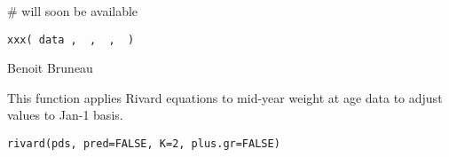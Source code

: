 \documentclass[a4paper]{book}
\begin{document}
%
\begin{Arguments}
\begin{ldescription}
\item[\code{x}] 


\item[\code{index}] 


\item[\code{threshold}] 


\end{ldescription}
\end{Arguments}
%
\begin{Examples}
\begin{ExampleCode}
# will soon be available
\end{ExampleCode}
\end{Examples}
\newpage
{}
%
\begin{Usage}
\begin{verbatim}
xxx( data ,  ,  ,  )
\end{verbatim}
\end{Usage}
%
\begin{Arguments}
\begin{ldescription}
\item[\code{data}] 


\end{ldescription}
\end{Arguments}
%
\begin{Author}\relax
Benoit Bruneau
\end{Author}
\newpage
{}
%
\begin{Description}\relax
This function applies Rivard equations to mid-year weight at age data to adjust values to Jan-1 basis. 
\end{Description}
%
\begin{Usage}
\begin{verbatim}
rivard(pds, pred=FALSE, K=2, plus.gr=FALSE)
\end{verbatim}
\end{Usage}
%
\begin{Arguments}
\begin{ldescription}
\item[\code{data}] 


\end{ldescription}
\end{Arguments}
\end{document}
